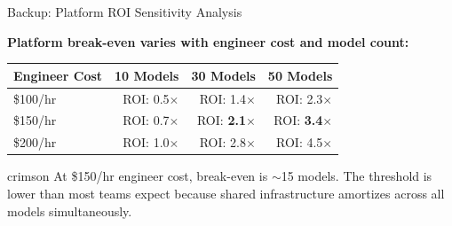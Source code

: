 \documentclass[aspectratio=169, 12pt]{beamer}
\begin{document}
\begin{frame}{Backup: Platform ROI Sensitivity Analysis}

\footnotesize
\textbf{Platform break-even varies with engineer cost and model count:}

\vspace{0.15cm}
\renewcommand{\arraystretch}{1.15}
\begin{tabular}{@{}lrrr@{}}
  \toprule
  \textbf{Engineer Cost} & \textbf{10 Models} & \textbf{30 Models} & \textbf{50 Models} \\
  \midrule
  \$100/hr & ROI: 0.5$\times$ & ROI: 1.4$\times$ & ROI: 2.3$\times$ \\
  \$150/hr & ROI: 0.7$\times$ & ROI: \textbf{2.1$\times$} & ROI: \textbf{3.4$\times$} \\
  \$200/hr & ROI: 1.0$\times$ & ROI: 2.8$\times$ & ROI: 4.5$\times$ \\
  \bottomrule
\end{tabular}

\vspace{0.15cm}
\begin{mlsyscard}{crimson}
{\footnotesize At \$150/hr engineer cost, break-even is $\sim$15 models. The threshold is lower than most teams expect because shared infrastructure amortizes across all models simultaneously.}
\end{mlsyscard}

\end{frame}
\end{document}
